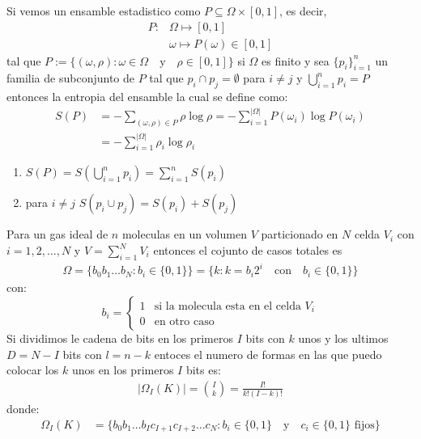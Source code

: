 \begin{answer}
    Si vemos un ensamble estadistico como $P\subseteq \Omega \times [0,1]$, es decir,
    \begin{align*}
        P: &\Omega \mapsto [0,1]\\
        &\omega \mapsto P(\omega) \in [0,1]
    \end{align*}
    tal que $P := \{(\omega,\rho): \omega \in \Omega \quad \text{y} \quad \rho \in [0,1]\}$ si $\Omega$ es finito y sea $\{p_i\}_{i=1}^n$ un familia de subconjunto de $P$ tal que $p_i \cap p_ j = \emptyset$ para $i\neq j$ y $\bigcup_{i=1}^n p_i = P$ entonces la entropia 
    del ensamble la cual se define como:
    \begin{align*}
        S(P) &= -\sum_{(\omega,\rho) \in P} \rho \log \rho = -\sum_{i = 1}^{|\Omega|} P(\omega_i) \log P(\omega_i)\\
        &= -\sum_{i = 1}^{|\Omega|} \rho_i \log \rho_i
    \end{align*} 
    \begin{enumerate}
        \item $S(P) = S\left(\bigcup_{i=1}^n p_i\right) = \sum_{i=1}^n S(p_i)$
        \item para $i\neq j$ $S(p_i \cup p_j) = S(p_i) + S(p_j)$
    \end{enumerate}
    Para un gas ideal de $n$ moleculas en un volumen $V$ particionado en $N$ celda $V_i$ con $i = 1,2,\dots,N$ y $V = \sum_{i=1}^N V_i$ entonces el cojunto de casos totales es 
    \begin{align*}
        \Omega = \{b_0b_1\dots b_N: b_i \in \{0,1\}\} = \{k: k = b_i 2^i \quad \text{con} \quad b_i \in \{0,1\}\}
    \end{align*}
    con:
    $$
     b_i = \begin{cases}
        1 & \text{si la molecula esta en el celda } V_i\\
        0 & \text{en otro caso}
    \end{cases}
    $$
    Si dividimos le cadena de bits en los primeros $I$ bits con $k$ unos y los ultimos $D = N - I$ bits con $l= n-k$ entoces el numero de formas en las que puedo colocar los $k$ unos en los primeros $I$ bits es:
    \begin{align*}
        |\Omega_I(K)|= \binom{I}{k} = \frac{I!}{k!(I-k)!}
    \end{align*}
    donde:
    \begin{align*}
        \Omega_I(K) &= \{b_0b_1 \dots b_Ic_{I+1}c_{I+2}\dots c_N: b_i \in \{0,1\} \quad \text{y} \quad c_i \in \{0,1\} \text{ fijos}\}\\

\end{align*}
\end{answer}
